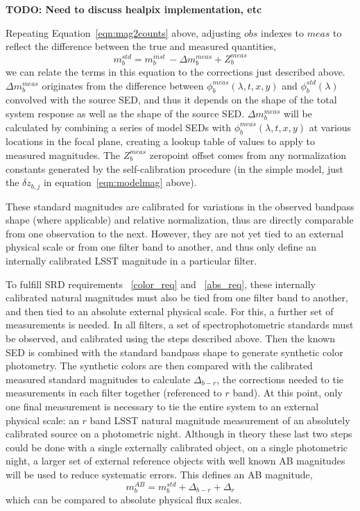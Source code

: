\documentclass[12pt,preprint]{aastex}
\begin{document}
{\bf TODO: Need to discuss healpix implementation, etc}

Repeating Equation~\ref{eqn:mag2counts} above, adjusting ${obs}$ indexes to ${meas}$ to 
reflect the difference between the true and measured quantities,
\begin{equation}
\label{eqn:magsFromCounts}
m_b^{std} = m_b^{inst} \, - \Delta m_b^{meas} + Z_b^{meas} 
\end{equation}
we can relate the terms in this equation to the corrections just
described above.  $\Delta m_b^{meas}$ originates from the difference
between $\phi_b^{meas}(\lambda,t,x,y)$ and $\phi_b^{std}(\lambda)$
convolved with the source SED, and thus it depends on the shape of the total
system response as well as the shape of the source SED. $\Delta
m_b^{meas}$ will be calculated by combining a series of model SEDs
with $\phi_b^{meas}(\lambda,t,x,y)$ at various locations in the focal
plane, creating a lookup table of values to apply to measured
magnitudes.  The $Z_b^{meas}$
zeropoint offset comes from any normalization constants generated by the 
self-calibration procedure (in the simple model, just the $\delta z_{b,j}$ in
equation~\ref{eqn:modelmag} above). 

These standard magnitudes are calibrated for variations in the
observed bandpass shape (where applicable) and relative normalization,
thus are directly comparable from one observation to the
next. However, they are not yet tied to an external physical scale or
from one filter band to another, and thus only define an internally
calibrated LSST magnitude in a particular filter.

To fulfill SRD requirements ~\ref{color_req} and ~\ref{abs_req}, these
internally calibrated natural magnitudes must also be tied from one filter
band to another, and then tied to an absolute external physical scale.
For this, a further set of measurements is needed. In all filters, a
set of spectrophotometric standards must be observed, and calibrated using
the steps described above. Then the known SED is combined with
the standard bandpass shape to generate synthetic color
photometry. The synthetic colors are then compared with the
calibrated measured standard magnitudes to calculate $\Delta_{b-r}$,
the corrections needed to tie measurements in each filter together
(referenced to $r$ band).  At this point, only one final measurement
is necessary to tie the entire system to an external physical scale:
an $r$ band LSST natural magnitude measurement of an absolutely
calibrated source on a photometric night. Although in theory these
last two steps could be done with a single externally calibrated
object, on a single photometric night, a larger set of external
reference objects with well known AB magnitudes will be used to reduce
systematic errors. This defines an AB magnitude,
\begin{equation}
\label{eqn:extmags}
m_b^{AB} = m_b^{std}  + \Delta_{b-r} + \Delta_r
\end{equation}
which can be compared to absolute physical flux scales. 
\end{document}
